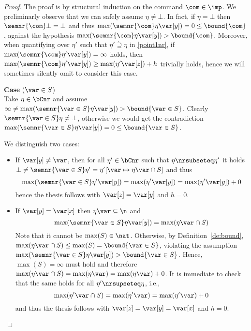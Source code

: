 \begin{proof}
  The proof is by structural induction on the command \(\com\in \imp\).
  We preliminarly observe that we can safely assume
  \(\eta \neq \bot\).
  In fact, if \(\eta = \bot\) then \(\semnr{\com} \bot = \bot\) and
  thus \(\max(\semnr{\com} \eta \var[y]) = 0 \leq \bound{\com}\),
  against the hypothesis
  \(\max(\semnr{\com}\eta \var[y]) > \bound{\com}\). Moreover, when
  quantifying over \(\eta'\) such that \(\eta' \dot{\supseteq} \eta\) in
  \ref{point1nr}, if \(\max(\semnr{\com}\eta' \var[y]) = \infty\)
  holds, then
  \(\max(\semnr{\com}\eta' \var[y]) \geq \max(\eta' \var[z]) + h\)
  trivially holds, hence we will sometimes silently omit to consider
  this case.
  
  \medskip
  
  \noindent
  \textbf{Case} (\(\var \in S\))\\
  Take \(\eta \in \bCnr\) and assume
  \(\infty\neq\max(\semnr{\var \in S}\eta \var[y]) > \bound{\var \in S}\).
  Clearly \(\semnr{\var \in S}\eta \neq \bot\), otherwise we would get the contradiction
  \(\max(\semnr{\var \in S}\eta \var[y]) =0 \leq \bound{\var \in S}\).
  
  We distinguish two cases:
  \begin{itemize}
    
  \item If \(\var[y] \neq \var\), then for all \(\eta' \in \bCnr\)
    such that \(\eta \nrsubseteq \eta'\) it holds
    \(\bot \neq \semnr{\var \in S}\eta' = \eta'[\var \mapsto \eta\var
      \cap S]\) and thus
    \[
    \max(\semnr{\var \in S}\eta' \var[y]) = \max(\eta' \var[y]) = \max(\eta' \var[y]) + 0
    \]
    hence the thesis follows with \(\var[z]=\var[y]\) and \(h = 0\).

  \item If \(\var[y] = \var[x]\) then  \(\eta\var \subseteq \n\) and
    \begin{equation*}
      \max(\semnr{\var \in S}\eta \var[y]) = \max (\eta\var \cap S)
    \end{equation*}
    Note that it cannot be \(\max(S)\in \nat\). Otherwise, by
    Definition~\ref{de:bound},
    \(\max (\eta\var \cap S) \leq \max(S)= \bound{\var \in
      S}\), violating the assumption \(\max(\semnr{\var \in S}\eta \var[y]) > \bound{\var \in S}\).
    Hence, \(\max(S) = \infty\) must hold and therefore
    \(\max (\eta\var \cap S) = \max(\eta\var)=
    \max(\eta\var)+0\). It is immediate to check that the same holds
    for all
    \(\eta' \nrsupseteq \eta\), i.e.,
    \[
    \max (\eta'\var \cap S) = \max(\eta'\var)=
    \max(\eta'\var)+0
    \]
    and thus the thesis follows with  \(\var[z]=\var[y]=\var[x]\) and \(h=0\).
  \end{itemize}  
  

\end{proof}
